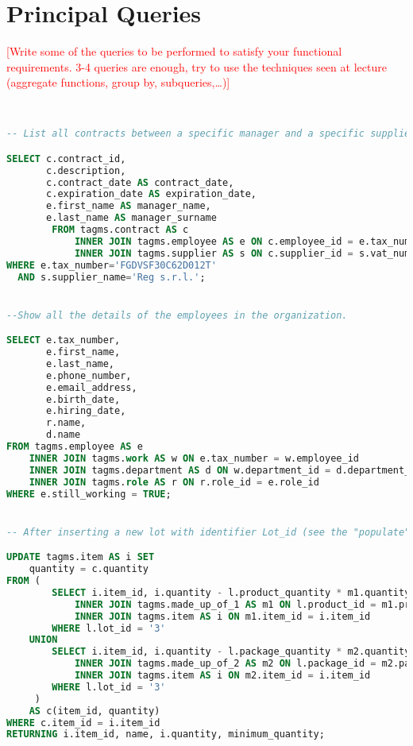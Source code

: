 \section{Principal Queries}
\textcolor{red}{[Write some of the queries to be performed to satisfy your functional requirements. 3-4 queries are enough, try to use the techniques seen at lecture (aggregate functions, group by, subqueries,…)]}

\begin{lstlisting}[language=SQL,
keywordstyle=\color{blue},
stringstyle=\color{mauve},
showstringspaces=false,
breaklines=true,
basicstyle=\ttfamily\footnotesize]


-- List all contracts between a specific manager and a specific supplier.

SELECT c.contract_id,
       c.description,
       c.contract_date AS contract_date,
       c.expiration_date AS expiration_date,
       e.first_name AS manager_name,
       e.last_name AS manager_surname
		FROM tagms.contract AS c
		    INNER JOIN tagms.employee AS e ON c.employee_id = e.tax_number
		    INNER JOIN tagms.supplier AS s ON c.supplier_id = s.vat_number
WHERE e.tax_number='FGDVSF30C62D012T'
  AND s.supplier_name='Reg s.r.l.';


--Show all the details of the employees in the organization.

SELECT e.tax_number,
       e.first_name,
       e.last_name,
       e.phone_number,
       e.email_address,
       e.birth_date,
       e.hiring_date,
       r.name,
       d.name
FROM tagms.employee AS e
    INNER JOIN tagms.work AS w ON e.tax_number = w.employee_id
    INNER JOIN tagms.department AS d ON w.department_id = d.department_id
    INNER JOIN tagms.role AS r ON r.role_id = e.role_id
WHERE e.still_working = TRUE;


-- After inserting a new lot with identifier Lot_id (see the "populate" section), decrease the quantity of the items involved in the production of a lot.

UPDATE tagms.item AS i SET
    quantity = c.quantity
FROM (
        SELECT i.item_id, i.quantity - l.product_quantity * m1.quantity AS quantity FROM tagms.lot AS l
            INNER JOIN tagms.made_up_of_1 AS m1 ON l.product_id = m1.product_id
            INNER JOIN tagms.item AS i ON m1.item_id = i.item_id
        WHERE l.lot_id = '3'
    UNION
        SELECT i.item_id, i.quantity - l.package_quantity * m2.quantity AS quantity FROM tagms.lot AS l
            INNER JOIN tagms.made_up_of_2 AS m2 ON l.package_id = m2.package_id
            INNER JOIN tagms.item AS i ON m2.item_id = i.item_id
        WHERE l.lot_id = '3'
     )
    AS c(item_id, quantity)
WHERE c.item_id = i.item_id
RETURNING i.item_id, name, i.quantity, minimum_quantity;



\end{lstlisting}
